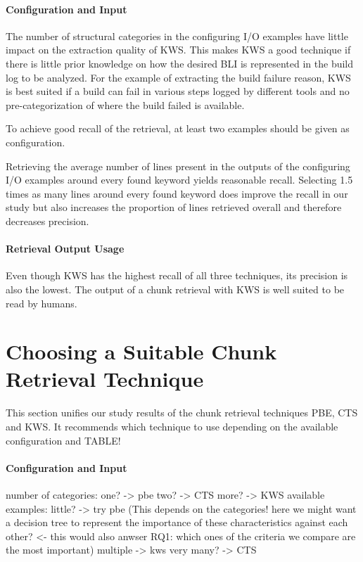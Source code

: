 \documentclass[\myrootdir/main.tex]{subfiles}
\begin{document}
\paragraph{Configuration and Input}
The number of structural categories in the configuring I/O examples have little impact on the extraction quality of KWS\@.
This makes KWS a good technique if there is little prior knowledge on how the desired BLI is represented in the build log to be analyzed.
For the example of extracting the build failure reason, KWS is best suited if a build can fail in various steps logged by different tools and no pre-categorization of where the build failed is available.

To achieve good recall of the retrieval, at least two examples should be given as configuration.

Retrieving the average number of lines present in the outputs of the configuring I/O examples around every found keyword yields reasonable recall.
Selecting 1.5 times as many lines around every found keyword does improve the recall in our study but also increases the proportion of lines retrieved overall and therefore decreases precision.

\paragraph{Retrieval Output Usage}
Even though KWS has the highest recall of all three techniques, its precision is also the lowest.
The output of a chunk retrieval with KWS is well suited to be read by humans.

\section{Choosing a Suitable Chunk Retrieval Technique}
This section unifies our study results of the chunk retrieval techniques PBE, CTS and KWS\@.
It recommends which technique to use depending on the available configuration and 
TABLE!
\paragraph{Configuration and Input}
number of categories:
one? -> pbe
two? -> CTS
more? -> KWS
available examples:
little? -> try pbe (This depends on the categories! here we might want a decision tree to represent the importance of these characteristics against each other? <- this would also anwser RQ1: which ones of the criteria we compare are the most important)
multiple -> kws
very many? -> CTS
\end{document}
